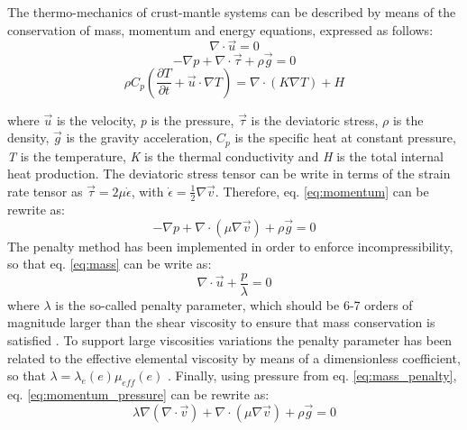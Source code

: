 \documentclass[draft,tec]{agutexSI2019}
\begin{document}
\begin{article}
The thermo-mechanics of crust-mantle systems can be described by means of the conservation of mass, momentum and energy equations, expressed as follows:
\begin{equation}\label{eq:mass}
\nabla \cdot \vec{u}=0
\end{equation}
\begin{equation}\label{eq:momentum}
-\nabla p + \nabla \cdot \vec{\tau} + \rho \vec{g} = 0
\end{equation}
\begin{equation}\label{eq:energy}
\rho C_p \left(\frac{\partial T}{\partial t} + \vec{u} \cdot \nabla T \right) = \nabla \cdot \left(K\nabla T\right) + H
\end{equation}

where $\vec{u}$ is the velocity, \textit{p} is the pressure, $\vec{\tau}$ is the deviatoric stress, $\rho$ is the density, $\vec{g}$ is the gravity acceleration, $C_p$ is the specific heat at constant pressure, \textit{T} is the temperature, \textit{K} is the thermal conductivity and \textit{H} is the total internal heat production. The deviatoric stress tensor can be write in terms of the strain rate tensor as $\vec{\tau}=2\mu\dot{\epsilon}$, with $\dot{\epsilon}=\frac{1}{2}\nabla\vec{v}$. Therefore, eq. \ref{eq:momentum} can be rewrite as:
\begin{equation}\label{eq:momentum_pressure}
-\nabla p + \nabla \cdot \left(\mu \nabla \vec{v}\right) + \rho \vec{g} = 0
\end{equation}
The penalty method has been implemented in order to enforce incompressibility, so that eq. \ref{eq:mass} can be write as:
\begin{equation}\label{eq:mass_penalty}
\nabla \cdot \vec{u} + \frac{p}{\lambda}=0
\end{equation}
where $\lambda$ is the so-called penalty parameter, which should be 6-7 orders of magnitude larger than the shear viscosity to ensure that mass conservation is satisfied \cite{Donea2003,Thieulot2014}. To support large viscosities variations the penalty parameter has been related to the effective elemental viscosity by means of a dimensionless coefficient, so that $\lambda=\lambda_e(e)\mu_{eff}(e)$ \cite{Marotta2006,Dabrowski2008,Thieulot2014}. Finally, using pressure from eq. \ref{eq:mass_penalty}, eq. \ref{eq:momentum_pressure} can be rewrite as:
\begin{equation}\label{eq:momentum_penalty}
\lambda \nabla \left(\nabla \cdot \vec{v} \right) + \nabla \cdot \left(\mu \nabla \vec{v}\right) + \rho \vec{g} = 0
\end{equation}

\end{article}
\end{document}
